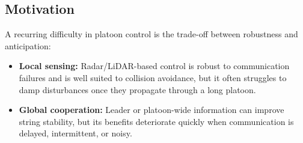 \subsection{Motivation}
A recurring difficulty in platoon control is the trade-off between robustness and anticipation:
\begin{itemize}
    \item \textbf{Local sensing:} Radar/LiDAR-based control is robust to communication failures and is well suited to collision avoidance, but it often struggles to damp disturbances once they propagate through a long platoon.
    \item \textbf{Global cooperation:} Leader or platoon-wide information can improve string stability, but its benefits deteriorate quickly when communication is delayed, intermittent, or noisy.
\end{itemize}

